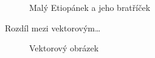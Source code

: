 \documentclass[a4paper, 11pt]{article}
\begin{document}
\begin{figure}[h]
{    
    }
    \caption{Malý Etiopánek a jeho bratříček}
    \label{fig:etiopan}
\end{figure}
\newpage
Rozdíl mezi vektorovým\dots
\begin{figure}[h]
    \centering
    \caption{Vektorový obrázek}
    \label{fig:vektor}
\end{figure}\\[1em]
\end{document}
